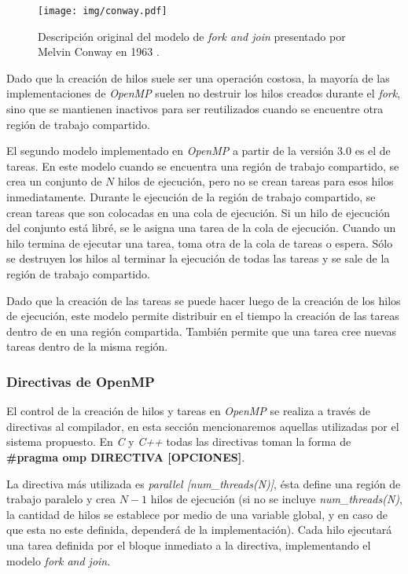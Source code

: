 \begin{figure}[h]

	\centering

	\texttt{[image: img/conway.pdf]}

	\caption{Descripción original del modelo de \emph{fork and join}
	presentado por Melvin Conway en 1963 \cite{conway1963}.}

	\label{conway}

\end{figure}

Dado que la creación de hilos suele ser una operación costosa, la mayoría de las
implementaciones de \emph{OpenMP} suelen no destruir los hilos creados durante
el \emph{fork}, sino que se mantienen inactivos para ser reutilizados cuando se
encuentre otra región de trabajo compartido.

El segundo modelo implementado en \emph{OpenMP} a partir de la versión 3.0 es
el de tareas. En este modelo cuando se encuentra una región de trabajo
compartido, se crea un conjunto de $N$ hilos de ejecución, pero no se crean
tareas para esos hilos inmediatamente. Durante le ejecución de la región de
trabajo compartido, se crean tareas que son colocadas en una cola de ejecución.
Si un hilo de ejecución del conjunto está libré, se le asigna una tarea de la
cola de ejecución. Cuando un hilo termina de ejecutar una tarea, toma otra de la
cola de tareas o espera. Sólo se destruyen los hilos al terminar la ejecución de
todas las tareas y se sale de la región de trabajo compartido.

Dado que la creación de las tareas se puede hacer luego de la creación de los
hilos de ejecución, este modelo permite distribuir en el tiempo la creación de
las tareas dentro de en una región compartida. También permite que una tarea
cree nuevas tareas dentro de la misma región.

\subsubsection{Directivas de OpenMP}

El control de la creación de hilos y tareas en \emph{OpenMP} se realiza a través
de directivas al compilador, en esta sección mencionaremos aquellas utilizadas
por el sistema propuesto. En \emph{C} y \emph{C++} todas las directivas toman la
forma de \textbf{\#pragma omp DIRECTIVA [OPCIONES]}.

La directiva más utilizada es \emph{parallel [num\_threads(N)]}, ésta define una
región de trabajo paralelo y crea $N-1$ hilos de ejecución (si no se incluye
\emph{num\_threads(N)}, la cantidad de hilos se establece por medio de una
variable global, y en caso de que esta no este definida, dependerá de la
implementación). Cada hilo ejecutará una tarea definida por el bloque inmediato
a la directiva, implementando el modelo \emph{fork and join}.

